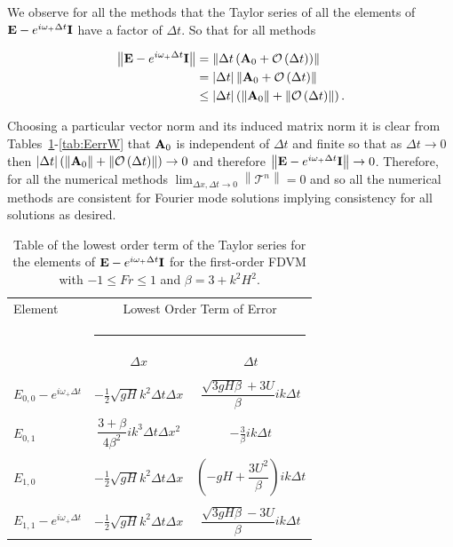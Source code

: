 We observe for all the methods that the Taylor series of all the elements of $\mathbf{E} -  e^{i \omega_+ \Delta t}\mathbf{I}$ have a factor of $\Delta t$. So that for all methods 

\begin{align*}
\left \| \mathbf{E} -  e^{i \omega_+ \Delta t}\mathbf{I} \right \| &=  \left \| \Delta t \left(\mathbf{A}_0 +  \mathcal{O}\left(\Delta t\right)\right)\right \|  \nonumber\\ &= |\Delta t|  \left \| \mathbf{A}_0 +  \mathcal{O}\left(\Delta t\right)\right \|
 \nonumber\\ &\le  |\Delta t| \left(\left \| \mathbf{A}_0 \right \| + \left \| \mathcal{O}\left(\Delta t\right)\right \|\right).
\end{align*} 

Choosing a particular vector norm and its induced matrix norm it is clear from Tables~\ref{tab:EerrFDVM1}-\ref{tab:EerrW} that $\mathbf{A}_0$ is independent of $\Delta t$ and finite so that as $\Delta t \rightarrow 0$ then $|\Delta t| \left(\left \| \mathbf{A}_0 \right \| + \left \| \mathcal{O}\left(\Delta t\right)\right \|\right)  \rightarrow 0$  and therefore  $\left \| \mathbf{E} -  e^{i \omega_+ \Delta t}\mathbf{I} \right \| \rightarrow 0$. Therefore, for all the numerical methods $ \lim_{\Delta x,\Delta t \rightarrow 0}\left \| \mathcal{T}^n \right \| = 0 $ and so all the numerical methods are consistent for Fourier mode solutions implying consistency for all solutions as desired. 

\begin{table}
	\begin{tabular}{l  c c}
	\hline
		Element & \multicolumn{2}{c}{Lowest Order Term of Error}\\
		&  \multicolumn{2}{l}{\rule{0.7\textwidth}{0.4pt}} \\
		& $\Delta x$&$\Delta t$\\
		\hline && \\
		$E_{0,0} -  e^{i \omega_+ \Delta t} $& $ - \frac{1}{2} \sqrt{gH} k^2 \Delta t\Delta x$ & $\dfrac{\sqrt{3gH \beta} + 3U}{\beta} ik \Delta t$ \\ & & \\
		$E_{0,1}$& $ \dfrac{3 + \beta}{4 \beta^2}i k^3\Delta  t\Delta x^2$ &  $ - \frac{3}{\beta} ik\Delta t$ \\ & & \\
		$E_{1,0}$& $ - \frac{1}{2} \sqrt{gH} k^2 \Delta t\Delta x$ &  $ \left(-gH + \dfrac{3U^2}{\beta}\right)ik \Delta t$ \\ & & \\
		$E_{1,1} -  e^{i \omega_+ \Delta t}$& $ - \frac{1}{2} \sqrt{gH} k^2 \Delta t\Delta x$ & $\dfrac{\sqrt{3gH \beta} - 3U}{\beta} ik \Delta t$ \\ 
		\hline
	\end{tabular}
	\caption{Table of the lowest order term of the Taylor series for the elements of $\mathbf{E} - e^{i \omega_+ \Delta t} \mathbf{I}$ for the first-order FDVM with $ -1 \le Fr \le 1$ and $\beta = 3 + k^2 H^2$.}
	\label{tab:EerrFDVM1} 
\end{table}


